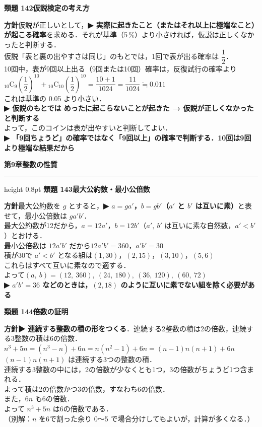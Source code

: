 \documentclass[a4paper,11pt]{ltjsarticle}
\newcommand{\ans}[2]{\Needspace{5\baselineskip}\vspace{6pt}%
  {\sffamily\bfseries 類題 #1\quad #2}\par}
\newcommand{\point}[1]{\textsf{\bfseries ▶ #1}}
\newcommand{\shouans}[2]{\Needspace{8\baselineskip}\vspace{10pt}\markboth{解答\quad #1\quad #2}{}%
  {\sffamily\bfseries\Large #1\quad #2\par}\vspace{2pt}\hrule height 0.8pt\vspace{2pt}}
\begin{document}
\ans{142}{仮説検定の考え方}
\begin{kai}
\textbf{方針}\quad 仮説が正しいとして，\point{実際に起きたこと（またはそれ以上に極端なこと）が起こる確率}を求める．それが基準（5\,\%）より小さければ，仮説は正しくなかったと判断する．\\[2pt]
仮説「表と裏の出やすさは同じ」のもとでは，1回で表が出る確率は $\dfrac12$．\\
10回中，表が9回以上出る（9回または10回）確率は，反復試行の確率より\\
\hspace*{1.5em}${}_{10}\mathrm C_9\left(\dfrac12\right)^{10}+{}_{10}\mathrm C_{10}\left(\dfrac12\right)^{10}=\dfrac{10+1}{1024}=\dfrac{11}{1024}\fallingdotseq0.011$\\[2pt]
これは基準の 0.05 より小さい．\\
\point{仮説のもとでは めったに起こらないことが起きた → 仮説が正しくなかったと判断する}\\
よって，このコインは表が出やすいと判断してよい．\\[2pt]
\point{「9回ちょうど」の確率ではなく「9回以上」の確率で判断する．10回は9回より極端な結果だから}
\end{kai}

\shouans{第9章}{整数の性質}
\ans{143}{最大公約数・最小公倍数}
\begin{kai}
\textbf{方針}\quad 最大公約数を $g$ とすると，\point{$a=ga'$，$b=gb'$（$a'$ と $b'$ は互いに素）}と表せて，最小公倍数は $ga'b'$．\\[2pt]
最大公約数が12だから，$a=12a'$，$b=12b'$（$a',\ b'$ は互いに素な自然数，$a'<b'$）とおける．\\
最小公倍数は $12a'b'$ だから\quad $12a'b'=360$，\quad $a'b'=30$\\[2pt]
積が30で $a'<b'$ となる組は\quad $(1,30)$，$(2,15)$，$(3,10)$，$(5,6)$\\
これらはすべて互いに素なので適する．\\[2pt]
よって\quad $(a,\ b)=(12,\ 360),\ (24,\ 180),\ (36,\ 120),\ (60,\ 72)$\\
\point{$a'b'=36$ などのときは，$(2,18)$ のように互いに素でない組を除く必要がある}
\end{kai}

\ans{144}{倍数の証明}
\begin{kai}
\textbf{方針}\quad \point{連続する整数の積の形をつくる}．連続する2整数の積は2の倍数，連続する3整数の積は6の倍数．\\[2pt]
$n^3+5n=(n^3-n)+6n=n(n^2-1)+6n=(n-1)n(n+1)+6n$\\[2pt]
$(n-1)n(n+1)$ は連続する3つの整数の積．\\
\hspace*{1.5em}連続する3整数の中には，2の倍数が少なくとも1つ，3の倍数がちょうど1つ含まれる．\\
\hspace*{1.5em}よって積は2の倍数かつ3の倍数，すなわち6の倍数．\\
また，$6n$ も6の倍数．\\[2pt]
よって $n^3+5n$ は6の倍数である．\\
（別解：$n$ を6で割った余り 0〜5 で場合分けしてもよいが，計算が多くなる．）
\end{kai}
\end{document}
